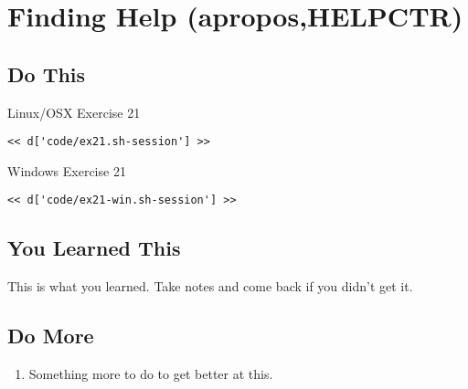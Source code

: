 \chapter{Finding Help (apropos,HELPCTR)}

\section{Do This}

\begin{code}{Linux/OSX Exercise 21}
\begin{Verbatim}
<< d['code/ex21.sh-session'] >>
\end{Verbatim}
\end{code}

\begin{code}{Windows Exercise 21}
\begin{Verbatim}
<< d['code/ex21-win.sh-session'] >>
\end{Verbatim}
\end{code}

\section{You Learned This}

This is what you learned.  Take notes and come back if you didn't get it.

\section{Do More}

\begin{enumerate}
\item Something more to do to get better at this.
\end{enumerate}

